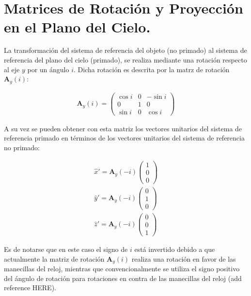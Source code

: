 \chapter{Matrices de Rotación y Proyección en el Plano del Cielo.}
\label{app:matrix}


La transformación del sistema de referencia del objeto (no primado) al sistema de referencia del plano del cielo (primado), se realiza mediante una rotación respecto al eje $y$ por un ángulo $i$. Dicha rotación es descrita por la matrz de rotación $\mathbf{A}_y(i)$:

\begin{align}
  \mathbf{A}_y(i) = \left(
  \begin{array}{ccc}
    \cos i & 0 & -\sin i \\
    0      & 1 & 0       \\
    \sin i & 0 & \cos i
  \end{array}\right)
\end{align}

A su vez se pueden obtener con esta matriz los vectores unitarios del sistema de referencia primado en términos de los vectores unitarios del sistema de referencia no primado:

\begin{align}
  \hat{x}' = \mathbf{A}_y(-i)\left(
  \begin{array}{c}
    1 \\ 0 \\ 0
  \end{array}\right)\\
  \hat{y}' = \mathbf{A}_y(-i)\left(
  \begin{array}{c}
    0 \\ 1 \\ 0
  \end{array} \right)\\
  \hat{z}' = \mathbf{A}_y(-i)\left(
  \begin{array}{c}
    0 \\ 0 \\ 1
  \end{array}\right)
\end{align}

Es de notarse que en este caso el signo de $i$ está invertido debido a que actualmente la matriz de rotación $\mathbf{A}_y(i)$ realiza una rotación en favor de las manecillas del reloj, mientras que convencionalmente se utiliza el signo positivo del ángulo de rotación para rotaciones en contra de las manecillas del reloj (add reference HERE).

